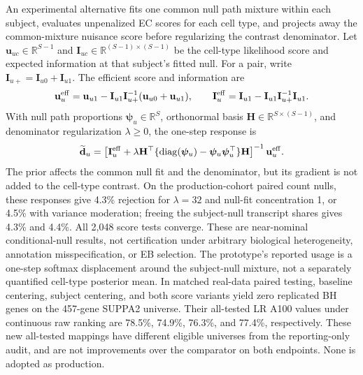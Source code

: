 \documentclass[11pt]{article}
\begin{document}
An experimental alternative fits one common null path mixture within each subject, evaluates unpenalized EC scores for each cell type, and projects away the common-mixture nuisance score before regularizing the contrast denominator. Let \(\mathbf u_{uc}\in\mathbb R^{S-1}\) and \(\mathbf I_{uc}\in\mathbb R^{(S-1)\times(S-1)}\) be the cell-type likelihood score and expected information at that subject's fitted null. For a pair, write \(\mathbf I_{u+}=\mathbf I_{u0}+\mathbf I_{u1}\). The efficient score and information are \begin{equation}\mathbf u_u^{\rm eff}=\mathbf u_{u1}-\mathbf I_{u1}\mathbf I_{u+}^{-1}(\mathbf u_{u0}+\mathbf u_{u1}),\qquad \mathbf I_u^{\rm eff}=\mathbf I_{u1}-\mathbf I_{u1}\mathbf I_{u+}^{-1}\mathbf I_{u1}.\end{equation} With null path proportions \(\boldsymbol\psi_u\in\mathbb R^S\), orthonormal basis \(\mathbf H\in\mathbb R^{S\times(S-1)}\), and denominator regularization \(\lambda\geq0\), the one-step response is \begin{equation}\widetilde{\mathbf d}_u=\left[\mathbf I_u^{\rm eff}+\lambda\mathbf H^\top\{\operatorname{diag}(\boldsymbol\psi_u)-\boldsymbol\psi_u\boldsymbol\psi_u^\top\}\mathbf H\right]^{-1}\mathbf u_u^{\rm eff}.\end{equation} The prior affects the common null fit and the denominator, but its gradient is not added to the cell-type contrast. On the production-cohort paired count nulls, these responses give 4.3\% rejection for \(\lambda=32\) and null-fit concentration 1, or 4.5\% with variance moderation; freeing the subject-null transcript shares gives 4.3\% and 4.4\%. All 2,048 score tests converge. These are near-nominal conditional-null results, not certification under arbitrary biological heterogeneity, annotation misspecification, or EB selection. The prototype's reported usage is a one-step softmax displacement around the subject-null mixture, not a separately quantified cell-type posterior mean. In matched real-data paired testing, baseline centering, subject centering, and both score variants yield zero replicated BH genes on the 457-gene SUPPA2 universe. Their all-tested LR A100 values under continuous raw ranking are 78.5\%, 74.9\%, 76.3\%, and 77.4\%, respectively. These new all-tested mappings have different eligible universes from the reporting-only audit, and are not improvements over the comparator on both endpoints. None is adopted as production.
\end{document}
